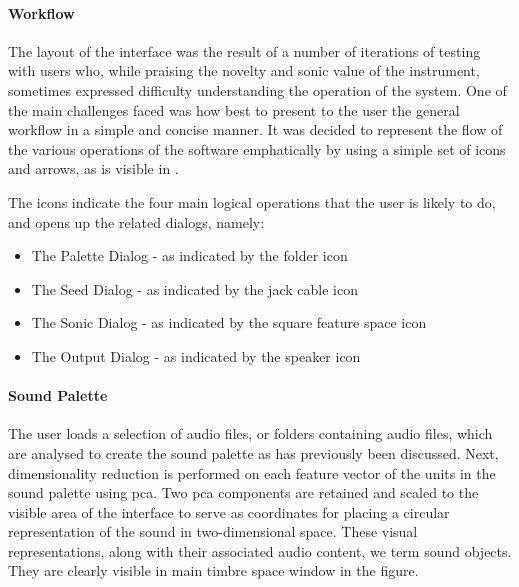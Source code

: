 \paragraph{Workflow}

The layout of the interface was the result of a number of iterations of testing with users who, while praising the novelty and sonic value of the instrument, sometimes expressed difficulty understanding the operation of the system. One of the main challenges faced was how best to present to the user the general workflow in a simple and concise manner. It was decided to represent the flow of the various operations of the software emphatically by using a simple set of icons and arrows, as is visible in .

 
The icons indicate the four main logical operations that the user is likely to do, and opens up the related dialogs, namely:
\begin{itemize}
  \item The Palette Dialog - as indicated by the folder icon
  \item The Seed Dialog - as indicated by the jack cable icon
  \item The Sonic Dialog - as indicated by the square feature space icon
  \item The Output Dialog - as indicated by the speaker icon
\end{itemize}

\paragraph{Sound Palette}

The user loads a selection of audio files, or folders containing audio files, which are analysed to create the sound palette as has previously been discussed. Next, dimensionality reduction is performed on each feature vector of the units in the sound palette using \acrfull{pca}. Two \acrshort{pca} components are retained and scaled to the visible area of the interface to serve as coordinates for placing a circular representation of the sound in two-dimensional space. These visual representations, along with their associated audio content, we term sound objects. They are clearly visible in main timbre space window in the figure.

